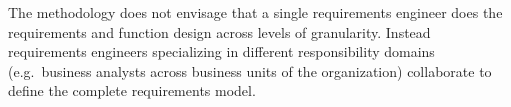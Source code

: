 
The methodology does not envisage that a single requirements engineer does the requirements and function design across levels of granularity. Instead requirements engineers specializing in different responsibility domains (e.g.\ business analysts across business units of the organization) collaborate to define the complete requirements model.
